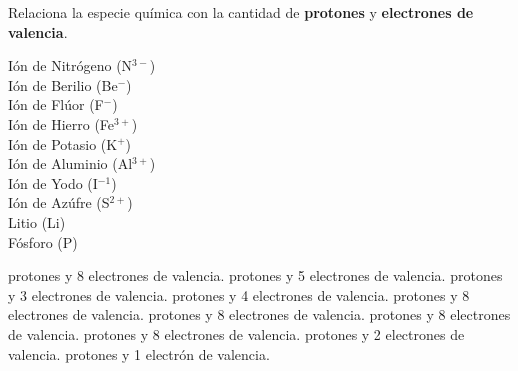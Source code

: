 Relaciona la especie química con la cantidad de \textbf{protones} y \textbf{electrones de valencia}.

\begin{multicols}{2}
    \begin{choices}
        \choice Ión de Nitrógeno (N$^{3-}$) \\  
        \choice Ión de Berilio (Be$^{-}$) \\  
        \choice Ión de Flúor   (F$^-$) \\  
        \choice Ión de Hierro (Fe$^{3+}$)  \\  
        \choice Ión de Potasio (K$^+$) \\ 
        \columnbreak
        \choice Ión de Aluminio  (Al$^{3+}$) \\ 
        \choice Ión de Yodo (I$^{-1}$) \\ 
        \choice Ión de Azúfre (S$^{2+}$) \\ 
        \choice Litio (Li) \\ 
        \choice Fósforo (P)    \\  
    \end{choices}
\end{multicols}
\begin{multicols}{2}
    \begin{parts}
         protones y 8 electrones de valencia.
         protones y 5 electrones de valencia.
         protones y 3 electrones de valencia.
         protones y 4 electrones de valencia.
         protones y 8 electrones de valencia.
         protones y 8 electrones de valencia.
         protones y 8 electrones de valencia.
         protones y 8 electrones de valencia.
         protones y 2 electrones de valencia.
         protones y 1 electrón de valencia.
    \end{parts}
\end{multicols}